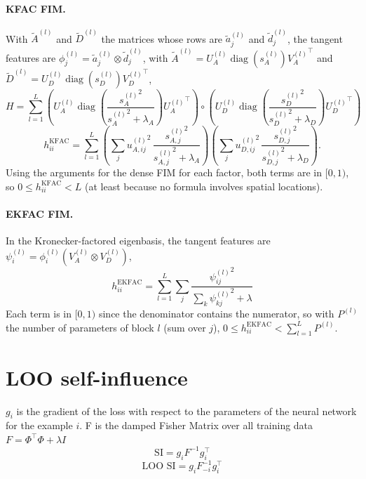 \documentclass[11pt]{article}
\DeclareMathOperator{\diag}{diag}
\begin{document}
\paragraph{KFAC FIM.}
With $\tilde{A}^{(l)}$ and $\tilde{D}^{(l)}$ the matrices whose rows are $\tilde{a}^{(l)}_j$ and $\tilde{d}^{(l)}_j$, the tangent features are $\phi^{(l)}_j=\tilde{a}^{(l)}_j\otimes\tilde{d}^{(l)}_j$, with $\tilde{A}^{(l)}=U^{(l)}_A\diag(s^{(l)}_A){V^{(l)}_A}^\top$ and $\tilde{D}^{(l)}=U^{(l)}_D\diag(s^{(l)}_D){V^{(l)}_D}^\top$,
\begin{equation*}
	H=\sum_{l=1}^L\left(U^{(l)}_A\diag\left(\frac{{s^{(l)}_A}^2}{{s^{(l)}_A}^2+\lambda_A}\right){U^{(l)}_A}^\top\right)\circ\left(U^{(l)}_D\diag\left(\frac{{s^{(l)}_D}^2}{{s^{(l)}_D}^2+\lambda_D}\right){U^{(l)}_D}^\top\right)
\end{equation*}
\begin{equation*}
	h^{\mathrm{KFAC}}_{ii}=\sum_{l=1}^L\left(\sum_j {u^{(l)}_{A,ij}}^2\,\frac{{s^{(l)}_{A,j}}^2}{{s^{(l)}_{A,j}}^2+\lambda_A}\right)\left(\sum_j {u^{(l)}_{D,ij}}^2\,\frac{{s^{(l)}_{D,j}}^2}{{s^{(l)}_{D,j}}^2+\lambda_D}\right).
\end{equation*}
Using the arguments for the dense FIM for each factor, both terms are in $[0,1)$, so $0\leq h^{\mathrm{KFAC}}_{ii}<L$ (at least because no formula involves spatial locations).

\paragraph{EKFAC FIM.}
In the Kronecker-factored eigenbasis, the tangent features are $\psi^{(l)}_i=\phi^{(l)}_i\left(V^{(l)}_A\otimes V^{(l)}_D\right)$,
\begin{equation*}
	h^{\mathrm{EKFAC}}_{ii}=\sum_{l=1}^L\sum_{j}\frac{{\psi^{(l)}_{ij}}^2}{\sum_k{\psi^{(l)}_{kj}}^2+\lambda}
\end{equation*}
Each term is in $[0,1)$ since the denominator contains the numerator, so with $P^{(l)}$ the number of parameters of block $l$ (sum over $j$), $0\leq h^{\mathrm{EKFAC}}_{ii}<\sum_{l=1}^L P^{(l)}$.

\section{LOO self-influence}
$g_i$ is the gradient of the loss with respect to the parameters of the neural network for the example $i$. F is the damped Fisher Matrix over all training data $F=\Phi^{\top}\Phi + \lambda I$
$$\text{SI}=g_i F^{-1}g_i^{\top}$$
$$\text{LOO SI}=g_i F^{-1}_{-i}g_i^{\top}$$
\end{document}
